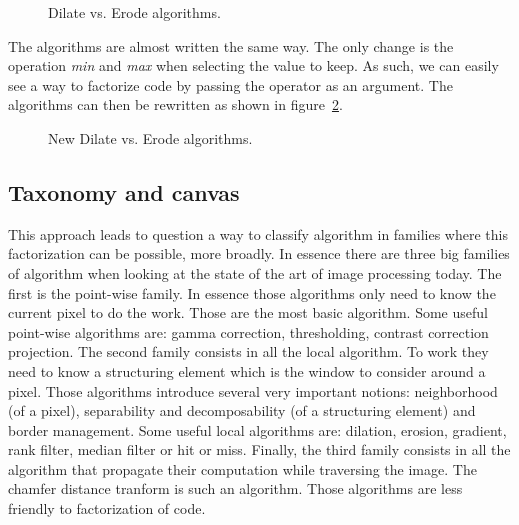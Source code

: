 \begin{figure}[tbh]
  \centering
  \hfil
  \caption{Dilate vs. Erode algorithms.}
  \label{fig.erode.dilate}
\end{figure}

The algorithms are almost written the same way. The only change is the operation \emph{min} and \emph{max} when
selecting the value to keep. As such, we can easily see a way to factorize code by passing the operator as an argument.
The algorithms can then be rewritten as shown in figure~\ref{fig.erode.dilate.factorized}.

\begin{figure}[tbh]
  \centering
  \vfil
  \smallskip
  \hfil
  \caption{New Dilate vs. Erode algorithms.}
  \label{fig.erode.dilate.factorized}
\end{figure}

\subsection{Taxonomy and canvas}

This approach leads to question a way to classify algorithm in families where this factorization can be possible, more
broadly. In essence there are three big families of algorithm when looking at the state of the art of image processing
today. The first is the point-wise family. In essence those algorithms only need to know the current pixel to do the
work. Those are the most basic algorithm. Some useful point-wise algorithms are: gamma correction, thresholding,
contrast correction projection. The second family consists in all the local algorithm. To work they need to know a
structuring element which is the window to consider around a pixel. Those algorithms introduce several very important
notions: neighborhood (of a pixel), separability and decomposability (of a structuring element) and border management.
Some useful local algorithms are: dilation, erosion, gradient, rank filter, median filter or hit or miss. Finally, the
third family consists in all the algorithm that propagate their computation while traversing the image. The chamfer
distance tranform is such an algorithm. Those algorithms are less friendly to factorization of code.

